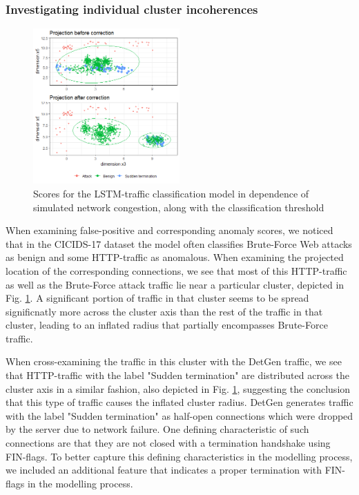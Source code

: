 \documentclass[conference]{IEEEtran}
\begin{document}

\subsubsection{Investigating individual cluster incoherences}

\begin{figure}
\centering
\includegraphics[width=0.5\textwidth]{images/Subspace_projection_new2.png}
\caption{Scores for the LSTM-traffic classification model in dependence of simulated network congestion, along with the classification threshold}\label{fig:Subspace_projection}
\end{figure}

When examining false-positive and corresponding anomaly scores, we noticed that in the CICIDS-17 dataset the model often classifies Brute-Force Web attacks as benign and some HTTP-traffic as anomalous. When examining the projected location of the corresponding connections, we see that most of this HTTP-traffic as well as the Brute-Force attack traffic lie near a particular cluster, depicted in Fig. \ref{fig:Subspace_projection}. A significant portion of traffic in that cluster seems to be spread significnatly more across the cluster axis than the rest of the traffic in that cluster, leading to an inflated radius that partially encompasses Brute-Force traffic. 

When cross-examining the traffic in this cluster with the DetGen traffic, we see that HTTP-traffic with the label "Sudden termination" are distributed across the cluster axis in a similar fashion, also depicted in Fig. \ref{fig:Subspace_projection}, suggesting the conclusion that this type of traffic causes the inflated cluster radius. DetGen generates traffic with the label "Sudden termination" as half-open connections which were dropped by the server due to network failure. One defining characteristic of such connections are that they are not closed with a termination handshake using FIN-flags. To better capture this defining characteristics in the modelling process, we included an additional feature that indicates a proper termination with FIN-flags in the modelling process. 
\end{document}
